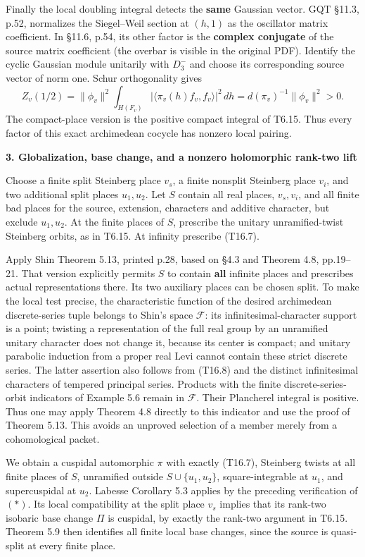 \documentclass[11pt,a4paper]{article}
\theoremstyle{definition}
\begin{document}
Finally the local doubling integral detects the \textbf{same} Gaussian vector. GQT §11.3, p.52, normalizes the Siegel--Weil section at \((h,1)\) as the oscillator matrix coefficient. In §11.6, p.54, its other factor is the \textbf{complex conjugate} of the source matrix coefficient (the overbar is visible in the original PDF). Identify the cyclic Gaussian module unitarily with \(D_3^-\) and choose its corresponding source vector of norm one. Schur orthogonality gives \[
Z_v(1/2)=\|\phi_v\|^2\int_{H(F_v)}
       |\langle\pi_v(h)f_v,f_v\rangle|^2\,dh
       =d(\pi_v)^{-1}\|\phi_v\|^2>0.
\tag{T16.9}
\] The compact-place version is the positive compact integral of T6.15. Thus every factor of this exact archimedean cocycle has nonzero local pairing.

\textbf{3. Globalization, base change, and a nonzero holomorphic rank-two lift}

Choose a finite split Steinberg place \(v_s\), a finite nonsplit Steinberg place \(v_i\), and two additional split places \(u_1,u_2\). Let \(S\) contain all real places, \(v_s,v_i\), and all finite bad places for the source, extension, characters and additive character, but exclude \(u_1,u_2\). At the finite places of \(S\), prescribe the unitary unramified-twist Steinberg orbits, as in T6.15. At infinity prescribe (T16.7).

Apply Shin Theorem 5.13, printed p.28, based on §4.3 and Theorem 4.8, pp.19--21. That version explicitly permits \(S\) to contain \textbf{all} infinite places and prescribes actual representations there. Its two auxiliary places can be chosen split. To make the local test precise, the characteristic function of the desired archimedean discrete-series tuple belongs to Shin's space \(\mathcal F\): its infinitesimal-character support is a point; twisting a representation of the full real group by an unramified unitary character does not change it, because its center is compact; and unitary parabolic induction from a proper real Levi cannot contain these strict discrete series. The latter assertion also follows from (T16.8) and the distinct infinitesimal characters of tempered principal series. Products with the finite discrete-series-orbit indicators of Example 5.6 remain in \(\mathcal F\). Their Plancherel integral is positive. Thus one may apply Theorem 4.8 directly to this indicator and use the proof of Theorem 5.13. This avoids an unproved selection of a member merely from a cohomological packet.

We obtain a cuspidal automorphic \(\pi\) with exactly (T16.7), Steinberg twists at all finite places of \(S\), unramified outside \(S\cup\{u_1,u_2\}\), square-integrable at \(u_1\), and supercuspidal at \(u_2\). Labesse Corollary 5.3 applies by the preceding verification of \((*)\). Its local compatibility at the split place \(v_s\) implies that its rank-two isobaric base change \(\Pi\) is cuspidal, by exactly the rank-two argument in T6.15. Theorem 5.9 then identifies all finite local base changes, since the source is quasi-split at every finite place.
\end{document}
